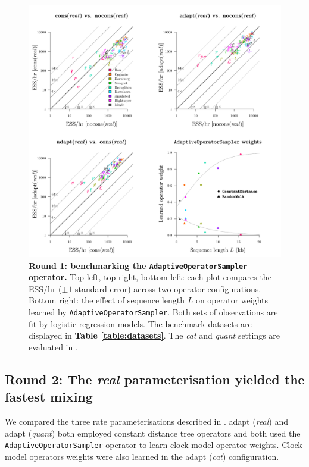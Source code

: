 \documentclass[10pt,letterpaper]{article}
\begin{document}
\begin{figure}[!h]
\includegraphics[width=\textwidth]{benchmarking/benchmarkingVM/ESS_round1_real.pdf}
\caption{\textbf{Round 1: benchmarking the \texttt{AdaptiveOperatorSampler} operator.} Top left, top right, bottom left: each plot compares the ESS/hr ($\pm 1$ standard error) across two operator configurations.
Bottom right: the effect of sequence length $L$ on operator weights learned by \texttt{AdaptiveOperatorSampler}. Both sets of observations are fit by logistic regression models.
 The benchmark datasets are displayed in \textbf{Table \ref{table:datasets}}. The \emph{cat} and \emph{quant} settings are evaluated in \textbf{}.  }
\label{fig:round1Results}
\end{figure}








\clearpage
\subsection*{Round 2: The \textit{real} parameterisation yielded the fastest mixing }

We compared the three rate parameterisations described in \textbf{}. 
adapt (\textit{real}) and adapt (\textit{quant}) both employed constant distance tree operators \cite{zhang2020improving} and both used the \texttt{AdaptiveOperatorSampler} operator to learn clock model operator weights.
Clock model operators weights were also learned in the adapt (\textit{cat}) configuration.
\end{document}

